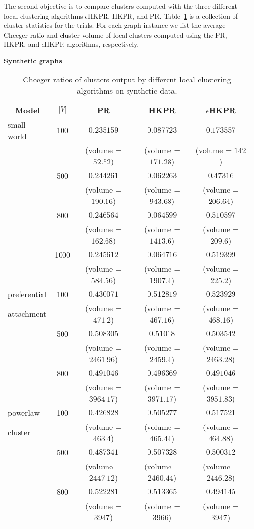\documentclass[runningheads,a4paper]{llncs}
\begin{document}
The second objective is to compare clusters computed with the three different
local clustering algorithms $\epsilon$HKPR, HKPR, and PR.
Table~\ref{table:cheegersynth} is a collection of cluster statistics for the
trials.  For each graph instance we list the average Cheeger ratio and cluster
volume of local clusters computed using the PR, HKPR, and $\epsilon$HKPR
algorithms, respectively.  

\begin{table}
\centering
\textbf{Synthetic graphs}\\
\begin{tabular}{|p{2cm}|c|c|c|c|}
\hline
\multicolumn{1}{|c|}{Model} & $|V|$ & PR & HKPR & $\epsilon$HKPR\\
\hline\hline
small world  & 100  & $0.235159$ & $0.087723$ & $0.173557$\\
             & & (volume = $52.52$) & (volume = $171.28$) & (volume = $142$)\\\cline{2-5}
             & 500  & $0.244261$ & $0.062263$  & $0.47316$\\
             & & (volume = $190.16$) & (volume = $943.68$) & (volume = $206.64$)\\\cline{2-5}
             & 800  & $0.246564$ & $0.064599$  & $0.510597$\\
             & & (volume = $162.68$) & (volume = $1413.6$) & (volume = $209.6$)\\\cline{2-5}
             & 1000 & $0.245612$ & $0.064716$ & $0.519399$\\
             & & (volume = $584.56$) & (volume = $1907.4$) & (volume = $225.2$)\\\hline
preferential & 100  & $0.430071$ & $0.512819$ & $0.523929$\\
attachment   & & (volume = $471.2$) & (volume = $467.16$) & (volume = $468.16$)\\\cline{2-5}
             & 500  & $0.508305$ & $0.51018$ & $0.503542$\\
             & & (volume = $2461.96$) & (volume = $2459.4$) & (volume = $2463.28$)\\\cline{2-5}
             & 800  & $0.491046$ & $0.496369$ & $0.491046$\\
             & & (volume = $3964.17$) & (volume = $3971.17$) & (volume =
$3951.83$)\\\hline
powerlaw     & 100  & $0.426828$ & $0.505277$ & $0.517521$\\
cluster      & & (volume = $463.4$) & (volume = $465.44$) & (volume = $464.88$)\\\cline{2-5}
             & 500  & $0.487341$ & $0.507328$ & $0.500312$\\
             & & (volume = $2447.12$) & (volume = $2460.44$) & (volume =
$2446.28$)\\\cline{2-5}
             & 800  & $0.522281$ & $0.513365$ & $0.494145$\\
             & & (volume = $3947$) & (volume = $3966$) & (volume = $3947$)\\
\hline 
\end{tabular}
\caption{Cheeger ratios of clusters output by different local clustering algorithms on
synthetic data.}
\label{table:cheegersynth}
\end{table}
\end{document}
